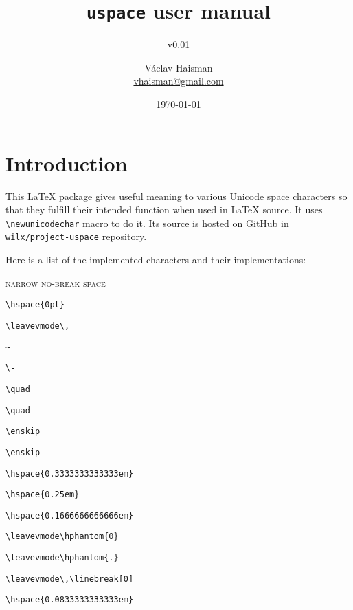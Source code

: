 \documentclass[paper=B5,DIV=calc,parskip=half]{scrartcl}
\author{Václav Haisman\texorpdfstring{%
    \\{\small\href{mailto:vhaisman+uspace@gmail.com?subject=[uspace]}{vhaisman@gmail.com}}}{}}
\date{\today}
\title{\texttt{uspace} user manual}
\subtitle{v0.01}
\newcommand{\zwsp}{\textsc{zero width space}}
\newcommand{\nnbsp}{\textsc{narrow no-break space}}
\newcommand{\nbsp}{\textsc{non-breaking space}}
\newcommand{\shy}{\textsc{soft hyphen}}
\newcommand{\enquad}{\textsc{en quad}}
\newcommand{\enspaceC}{\textsc{en space}}
\newcommand{\emquad}{\textsc{em quad}}
\newcommand{\emspaceC}{\textsc{em space}}
\newcommand{\threePerEm}{\textsc{three-per-em space}}
\newcommand{\fourPerEm}{\textsc{four-per-em space}}
\newcommand{\sixPerEm}{\textsc{six-per-em space}}
\newcommand{\figuresp}{\textsc{figure space}}
\newcommand{\punctsp}{\textsc{punctuation space}}
\newcommand{\thinsp}{\textsc{thin space}}
\newcommand{\hairsp}{\textsc{hair space}}
\begin{document}
\begin{titlepage}
  \maketitle
\end{titlepage}

\tableofcontents

\section{Introduction}%
%
This \LaTeX{} package gives useful meaning to various Unicode space
characters so that they fulfill their intended function when used in \LaTeX{}
source. It uses \lstinline|\newunicodechar| macro to do it. Its source is
hosted on GitHub in
\texttt{\href{https://github.com/wilx/project-uspace}{wilx/project-uspace}}
repository.

Here is a list of the implemented characters
and their implementations:\nobreak%
\begin{labeling}[\quad]{\nnbsp{}}
\item[\zwsp] \lstinline|\hspace{0pt}|
\item[\nnbsp] \lstinline|\leavevmode\,|
\item[\nbsp{\footnotemark[1]}] \lstinline|~|
\item[\shy{\footnotemark[1]}] \lstinline|\-|
\item[\emquad{\footnotemark[2]}] \lstinline|\quad|
\item[\emspaceC{\footnotemark[2]}] \lstinline|\quad|
\item[\enquad{\footnotemark[3]}] \lstinline|\enskip|
\item[\enspaceC{\footnotemark[3]}] \lstinline|\enskip|
\item[\threePerEm] \lstinline|\hspace{0.3333333333333em}|
\item[\fourPerEm] \lstinline|\hspace{0.25em}|
\item[\sixPerEm] \lstinline|\hspace{0.1666666666666em}|
\item[\figuresp] \lstinline|\leavevmode\hphantom{0}|
\item[\punctsp] \lstinline|\leavevmode\hphantom{.}|
\item[\thinsp] \lstinline|\leavevmode\,\linebreak[0]|
\item[\hairsp] \lstinline|\hspace{0.0833333333333em}|
\end{labeling}
\end{document}
